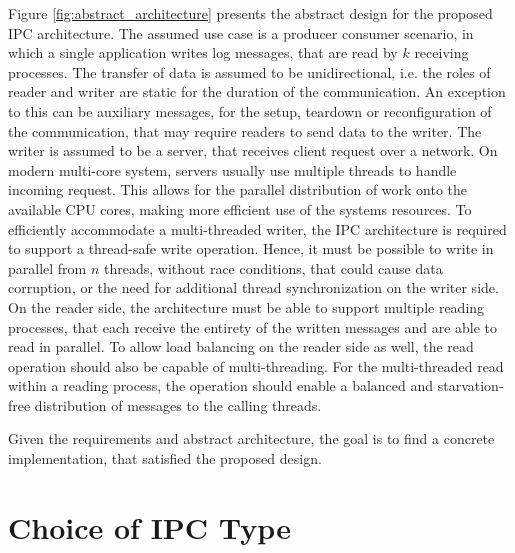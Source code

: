 Figure \ref{fig:abstract_architecture} presents the abstract design for the proposed \ac{IPC} architecture.
The assumed use case is a producer consumer scenario, in which a single application writes log messages, that 
are read by $k$ receiving processes. The transfer of data is assumed to be unidirectional, i.e. the roles of reader and writer are static for the duration of the
communication. An exception to this can be auxiliary messages, for the setup, teardown or reconfiguration of the communication, that may require readers to send
data to the writer. The writer is assumed to be a server, that receives client request over a network.
On modern multi-core system, servers usually use multiple threads to handle incoming request.
This allows for the parallel distribution of work onto the available CPU cores, making more efficient use of the systems resources. To efficiently accommodate a 
multi-threaded writer, the \ac{IPC} architecture is required to support a thread-safe write operation. Hence, it must be possible to
write in parallel from $n$ threads, without race conditions, that could cause data corruption, or the need for additional thread synchronization    
on the writer side. On the reader side, the architecture must be able to support multiple reading processes, that each receive the entirety
of the written messages and are able to read in parallel. To allow load balancing on the reader side as well, the read operation
should also be capable of multi-threading. For the multi-threaded read within a reading process, the operation should enable a balanced and starvation-free distribution 
of messages to the calling threads.  
\par
Given the requirements and abstract architecture, the goal is to find a concrete implementation, that satisfied the proposed design.


\section{Choice of IPC Type}

